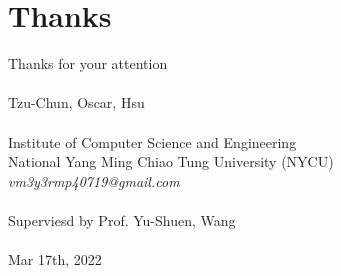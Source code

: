 \documentclass{beamer}
\begin{document}
\section{Thanks}
\begin{frame}
    \begin{center}
        \Huge{Thanks for your attention} \\~\\
        \normalsize{Tzu-Chun, Oscar, Hsu} \\~\\
        \small{Institute of Computer Science and Engineering} \\
        \small{National Yang Ming Chiao Tung University (NYCU)} \\
        \small{\textit{vm3y3rmp40719@gmail.com}} \\~\\
        \small{Superviesd by Prof. Yu-Shuen, Wang} \\~\\
        Mar 17th, 2022
    \end{center}
\end{frame}
\end{document}
